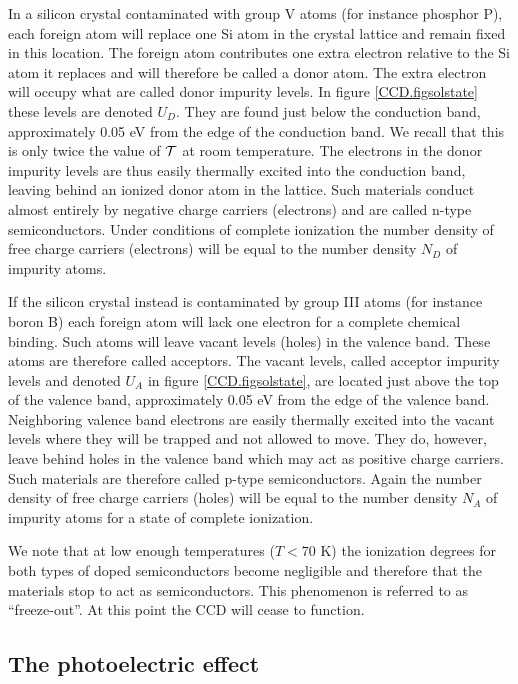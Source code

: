 \documentclass{article}
\def\cl#1{{\cal #1}}               %
\begin{document}
In a silicon crystal contaminated with group V atoms (for instance
phosphor P), each foreign atom will replace one Si atom in the crystal
lattice and remain fixed in this location. The foreign atom
contributes one extra electron relative to the Si atom it replaces and
will therefore be called a donor atom. The extra electron will occupy
what are called donor impurity levels. In figure \ref{CCD.figsolstate}
these levels are denoted $U_D$. They are found just below the
conduction band, approximately 0.05 eV from the edge of the conduction
band. We recall that this is only twice the value of $\cl T$ at room
temperature. The electrons in the donor impurity levels are thus
easily thermally excited into the conduction band, leaving behind an
ionized donor atom in the lattice. Such materials conduct almost
entirely by negative charge carriers (electrons) and are called n-type
semiconductors. Under conditions of complete ionization the number
density of free charge carriers (electrons) will be equal to the
number density $N_D$ of impurity atoms.

If the silicon crystal instead is contaminated by group III atoms (for
instance boron B) each foreign atom will lack one electron for a
complete chemical binding. Such atoms will leave vacant levels (holes)
in the valence band. These atoms are therefore called acceptors.  The
vacant levels, called acceptor impurity levels and denoted $U_A$ in
figure \ref{CCD.figsolstate}, are located just above the top of the
valence band, approximately 0.05 eV from the edge of the valence band.
Neighboring valence band electrons are easily thermally excited into
the vacant levels where they will be trapped and not allowed to
move. They do, however, leave behind holes in the valence band which
may act as positive charge carriers. Such materials are therefore
called p-type semiconductors. Again the number density of free charge
carriers (holes) will be equal to the number density $N_A$ of impurity
atoms for a state of complete ionization.

We note that at low enough temperatures ($T < 70$ K) the ionization
degrees for both types of doped semiconductors become negligible and
therefore that the materials stop to act as semiconductors. This
phenomenon is referred to as ``freeze-out''. At this point the CCD
will cease to function.

\subsection*{The photoelectric effect}
\end{document}
